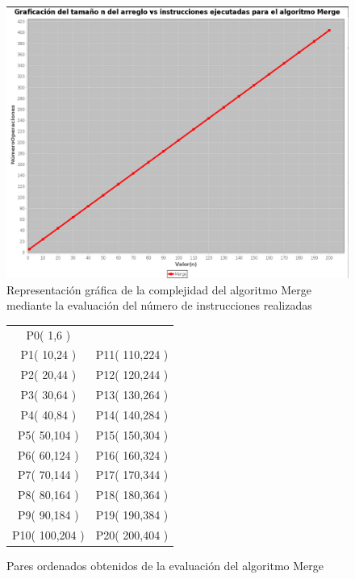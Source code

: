         \begin{figure}[h!]
            \centering
            \includegraphics[width=19cm]{MergeSort/GraficaMerge.png}
            \caption{Representación gráfica de la complejidad del algoritmo Merge mediante la evaluación del número de instrucciones realizadas}
            \label{GraficaMerge}
        \end{figure}
        
        \begin{figure}[h!]
            \centering
            \begin{tabular}{c c}
            P0( 1,6 ) & \\
                P1( 10,24 ) & P11( 110,224 )\\
                P2( 20,44 ) & P12( 120,244 )\\
                P3( 30,64 ) & P13( 130,264 )\\
                P4( 40,84 ) & P14( 140,284 )\\
                P5( 50,104 ) & P15( 150,304 )\\
                P6( 60,124 ) & P16( 160,324 )\\
                P7( 70,144 ) & P17( 170,344 )\\
                P8( 80,164 ) & P18( 180,364 )\\
                P9( 90,184 ) & P19( 190,384 )\\
                P10( 100,204 ) & P20( 200,404 )\\
            \end{tabular}
            \caption{Pares ordenados obtenidos de la evaluación del algoritmo Merge}
            \label{PuntosMerge}
        \end{figure}
    
